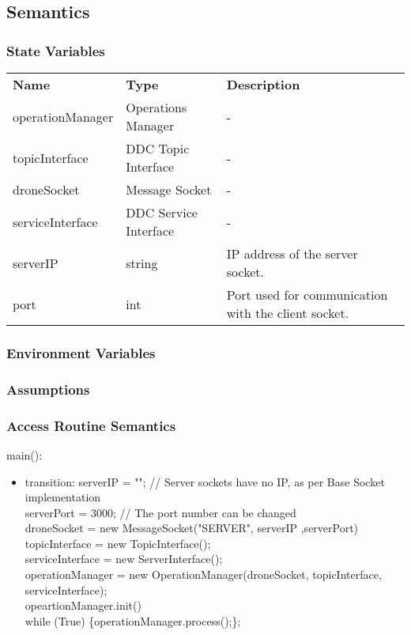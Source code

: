 \documentclass[12pt, titlepage]{article}
\begin{document}
\subsection{Semantics}
\subsubsection{State Variables}
\begin{center}
\begin{tabular}{p{3 cm} p{4cm} p{5cm} }
\hline
\textbf{Name} & \textbf{Type} & \textbf{Description}  \\
operationManager & Operations Manager & - \\
topicInterface & DDC Topic Interface & - \\
droneSocket & Message Socket & - \\
serviceInterface & DDC Service Interface & - \\
serverIP & string & IP address of the server socket. \\
port & int & Port used for communication with the client socket. \\
\hline
\hline
\end{tabular}
\end{center}
\subsubsection{Environment Variables}
\subsubsection{Assumptions}
\subsubsection{Access Routine Semantics}
\noindent main():
\begin{itemize}
\item transition: 
serverIP = ""; // Server sockets have no IP, as per Base Socket implementation \\
serverPort = 3000; // The port number can be changed \\
droneSocket = new MessageSocket("SERVER", serverIP ,serverPort)\\
topicInterface = new TopicInterface();\\
serviceInterface = new ServerInterface();\\
operationManager = new OperationManager(droneSocket, topicInterface, serviceInterface);\\
	opeartionManager.init() \\
	while (True) \{operationManager.process();\};
\end{itemize}
\end{document}
